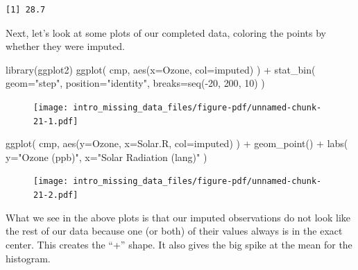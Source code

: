 \documentclass[
  letterpaper,
  DIV=11,
  numbers=noendperiod]{scrreprt}
\newenvironment{Shaded}{\begin{snugshade}}{\end{snugshade}}
\newcommand{\AttributeTok}[1]{\textcolor[rgb]{0.49,0.56,0.16}{#1}}
\newcommand{\DecValTok}[1]{\textcolor[rgb]{0.25,0.63,0.44}{#1}}
\newcommand{\FunctionTok}[1]{\textcolor[rgb]{0.02,0.16,0.49}{#1}}
\newcommand{\NormalTok}[1]{\textcolor[rgb]{0.00,0.44,0.13}{#1}}
\newcommand{\SpecialCharTok}[1]{\textcolor[rgb]{0.25,0.44,0.63}{#1}}
\newcommand{\StringTok}[1]{\textcolor[rgb]{0.25,0.44,0.63}{#1}}
\begin{document}
\begin{verbatim}
[1] 28.7
\end{verbatim}

Next, let's look at some plots of our completed data, coloring the
points by whether they were imputed.

\begin{Shaded}
\begin{Highlighting}[]
\FunctionTok{library}\NormalTok{(ggplot2)}
\FunctionTok{ggplot}\NormalTok{( cmp, }\FunctionTok{aes}\NormalTok{(}\AttributeTok{x=}\NormalTok{Ozone, }\AttributeTok{col=}\NormalTok{imputed) ) }\SpecialCharTok{+}
    \FunctionTok{stat\_bin}\NormalTok{( }\AttributeTok{geom=}\StringTok{"step"}\NormalTok{, }\AttributeTok{position=}\StringTok{"identity"}\NormalTok{,}
              \AttributeTok{breaks=}\FunctionTok{seq}\NormalTok{(}\SpecialCharTok{{-}}\DecValTok{20}\NormalTok{, }\DecValTok{200}\NormalTok{, }\DecValTok{10}\NormalTok{) )}
\end{Highlighting}
\end{Shaded}

\begin{figure}[H]

{\centering \texttt{[image: intro\_missing\_data\_files/figure-pdf/unnamed-chunk-21-1.pdf]}

}

\end{figure}

\begin{Shaded}
\begin{Highlighting}[]
\FunctionTok{ggplot}\NormalTok{( cmp, }\FunctionTok{aes}\NormalTok{(}\AttributeTok{y=}\NormalTok{Ozone, }\AttributeTok{x=}\NormalTok{Solar.R, }\AttributeTok{col=}\NormalTok{imputed) ) }\SpecialCharTok{+}
    \FunctionTok{geom\_point}\NormalTok{() }\SpecialCharTok{+}
    \FunctionTok{labs}\NormalTok{( }\AttributeTok{y=}\StringTok{"Ozone (ppb)"}\NormalTok{, }\AttributeTok{x=}\StringTok{"Solar Radiation (lang)"}\NormalTok{ )}
\end{Highlighting}
\end{Shaded}

\begin{figure}[H]

{\centering \texttt{[image: intro\_missing\_data\_files/figure-pdf/unnamed-chunk-21-2.pdf]}

}

\end{figure}

What we see in the above plots is that our imputed observations do not
look like the rest of our data because one (or both) of their values
always is in the exact center. This creates the ``+'' shape. It also
gives the big spike at the mean for the histogram.
\end{document}

